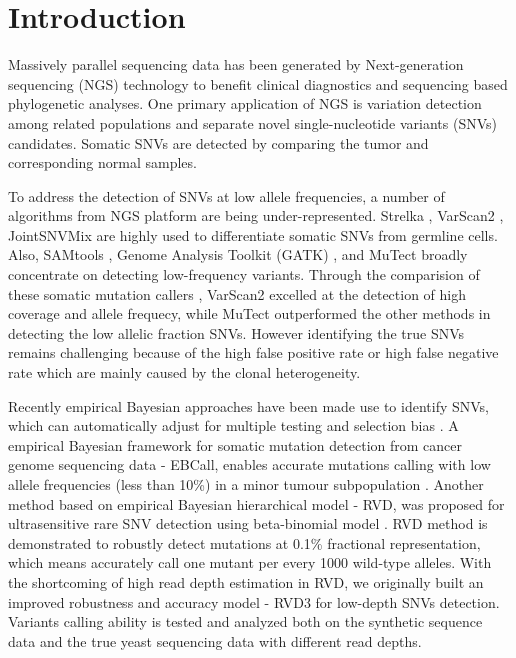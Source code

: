 \documentclass{bioinfo}
\begin{document}
\section{Introduction}
Massively parallel sequencing data has been generated by Next-generation sequencing (NGS) technology to benefit clinical diagnostics and sequencing based phylogenetic analyses.
One primary application of NGS is variation detection among related populations and separate novel single-nucleotide variants (SNVs) candidates.
Somatic SNVs are detected by comparing the tumor and corresponding normal samples.

To address the detection of SNVs at low allele frequencies, a number of algorithms from NGS platform are being under-represented.
Strelka \citep{Saunders:2012fh}, VarScan2 \citep{Koboldt:2012cga}, JointSNVMix \citep{roth2012jointsnvmix} are highly used to differentiate somatic SNVs from germline cells.
Also, SAMtools \citep{li2009sequence}, Genome Analysis Toolkit (GATK) \citep{McKenna:2010bva}, and MuTect \citep{Cibulskis:2013ta} broadly concentrate on detecting low-frequency variants.
Through the comparision of these somatic mutation callers \citep{wang2013detecting}, VarScan2 excelled at the detection of high coverage and allele frequecy, while MuTect outperformed the other methods in detecting the low allelic fraction SNVs.
However identifying the true SNVs remains challenging because of the high false positive rate or high false negative rate which are mainly caused by the clonal heterogeneity.

Recently empirical Bayesian approaches have been made use to identify SNVs, which can automatically adjust for multiple testing and selection bias \citep{liao2014prior}.
A empirical Bayesian framework for somatic mutation detection from cancer genome sequencing data - EBCall, enables accurate mutations calling with low allele frequencies (less than 10\%) in a minor tumour subpopulation \citep{shiraishi2013empirical}.
Another method based on empirical Bayesian hierarchical model - RVD, was proposed for ultrasensitive rare SNV detection using beta-binomial model \citep{Flaherty:2011ja}.
RVD method is demonstrated to robustly detect mutations at 0.1\% fractional representation, which means accurately call one mutant per every 1000 wild-type alleles.
With the shortcoming of high read depth estimation in RVD, we originally built an improved robustness and accuracy model - RVD3 for low-depth SNVs detection.
Variants calling ability is tested and analyzed both on the synthetic sequence data and the true yeast sequencing data with different read depths.
\end{document}
